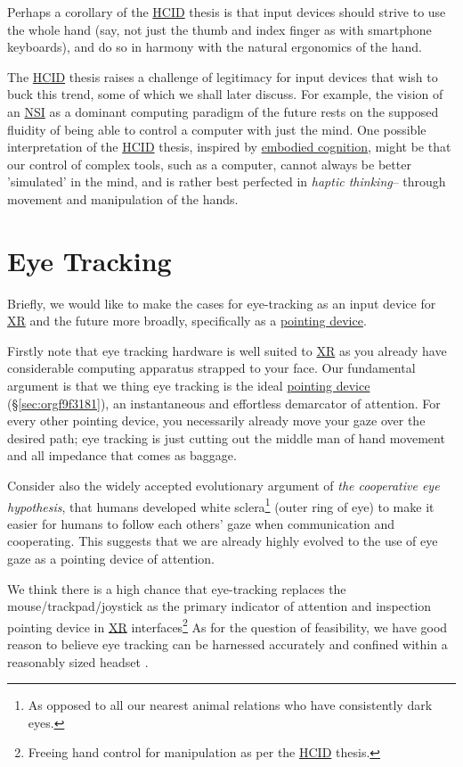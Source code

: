 \documentclass[logo,bsc,singlespacing,parskip]{infthesis}
\begin{document}
Perhaps a corollary of the \hyperref[orgc00eca5]{HCID} thesis is that input devices should strive to use the whole hand (say, not just the thumb and index finger as with smartphone keyboards), and do so in harmony with the natural ergonomics of the hand.

The \hyperref[orgc00eca5]{HCID} thesis raises a challenge of legitimacy for input devices that wish to buck this trend, some of which we shall later discuss.
For example, the vision of an \hyperref[org79fc546]{NSI} as a dominant computing paradigm of the future rests on the supposed fluidity of being able to control a computer with just the mind.
One possible interpretation of the \hyperref[orgc00eca5]{HCID} thesis, inspired by \hyperref[orgcc8d0dd]{embodied cognition}, might be that our control of complex tools, such as a computer, cannot always be better 'simulated' in the mind, and is rather best perfected in \emph{haptic thinking}-- through movement and manipulation of the hands.

\section{Eye Tracking}
\label{sec:org637b38d}
Briefly, we would like to make the cases for eye-tracking as an input device for \hyperref[org1d567af]{XR} and the future more broadly, specifically as a \hyperref[pointing device]{pointing device}.

Firstly note that eye tracking hardware is well suited to \hyperref[org1d567af]{XR} as you already have considerable computing apparatus strapped to your face.
Our fundamental argument is that we thing eye tracking is the ideal \hyperref[sec:orgf9f3181]{pointing device} (\S \ref{sec:orgf9f3181}), an instantaneous and effortless demarcator of attention.
For every other pointing device, you necessarily already move your gaze over the desired path; eye tracking is just cutting out the middle man of hand movement and all impedance that comes as baggage.

Consider also the widely accepted evolutionary argument of \emph{the cooperative eye hypothesis}, that humans developed white sclera\footnote{As opposed to all our nearest animal relations who have consistently dark eyes.} (outer ring of eye) to make it easier for humans to follow each others' gaze when communication and cooperating.
This suggests that we are already highly evolved to the use of eye gaze as a pointing device of attention.

We think there is a high chance that eye-tracking replaces the mouse/trackpad/joystick as the primary indicator of attention and inspection pointing device in \hyperref[org1d567af]{XR} interfaces\footnote{Freeing hand control for manipulation as per the \hyperref[orgc00eca5]{HCID} thesis.}
As for the question of feasibility, we have good reason to believe eye tracking can be harnessed accurately \autocites{PrecisionGazeMouse}[][]{TobiiGamingNext} and confined within a reasonably sized headset \autocite{VIVEProEye}.
\end{document}
